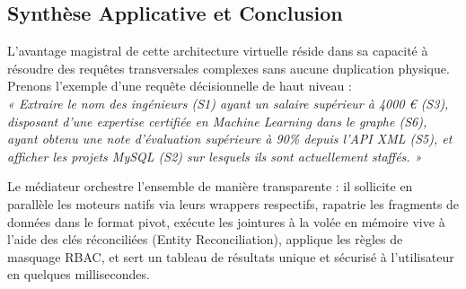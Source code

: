 \documentclass[11pt,a4paper]{article}
\begin{document}
\begin{center}
\end{center}

\subsection*{Synthèse Applicative et Conclusion}
L'avantage magistral de cette architecture virtuelle réside dans sa capacité à résoudre des requêtes transversales complexes sans aucune duplication physique. Prenons l'exemple d'une requête décisionnelle de haut niveau : \\
\textit{« Extraire le nom des ingénieurs (S1) ayant un salaire supérieur à 4000 € (S3), disposant d'une expertise certifiée en Machine Learning dans le graphe (S6), ayant obtenu une note d'évaluation supérieure à 90\% depuis l'API XML (S5), et afficher les projets MySQL (S2) sur lesquels ils sont actuellement staffés. »}

Le médiateur orchestre l'ensemble de manière transparente : il sollicite en parallèle les moteurs natifs via leurs wrappers respectifs, rapatrie les fragments de données dans le format pivot, exécute les jointures à la volée en mémoire vive à l'aide des clés réconciliées (Entity Reconciliation), applique les règles de masquage RBAC, et sert un tableau de résultats unique et sécurisé à l'utilisateur en quelques millisecondes.
\end{document}
